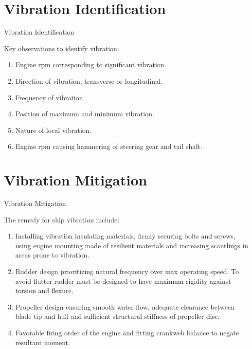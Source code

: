 \documentclass{beamer}
\begin{document}
\section{Vibration Identification}
	\begin{frame}[t]{Vibration Identification}\vspace{10pt}
	\begin{block}{Key observations to identify vibration:}
	\end{block}
	\begin{enumerate}
	\item Engine rpm corresponding to significant vibration.
	\item Direction of vibration, transverse or longitudinal.
	\item Frequency of vibration.
	\item Position of maximum and minimum vibration.
	\item Nature of local vibration.
	\item Engine rpm causing hammering of steering gear and tail 		shaft.
	\end{enumerate}
	\end{frame}

\section{Vibration Mitigation}
	\begin{frame}[t]{Vibration Mitigation}\vspace{10pt}
	\begin{block}{The remedy for ship vibration include:}
	\end{block}
	\begin{enumerate}
	\item Installing vibration insulating materials, firmly 			securing bolts and screws, using engine mounting made of 			resilient materials and increasing scantlings in areas prone 		to vibration.
	\item Rudder design prioritizing natural frequency over max 		operating speed. To avoid flutter rudder must be designed to 		have maximum rigidity against torsion and flexure.
	\item Propeller design ensuring smooth water flow, adequate 		clearance between blade tip and hull and sufficient 				structural stiffness of propeller disc.
	\item Favorable firing order of the engine and fitting 				crankweb balance to negate resultant moment.
	\end{enumerate}
	\end{frame}
\end{document}
